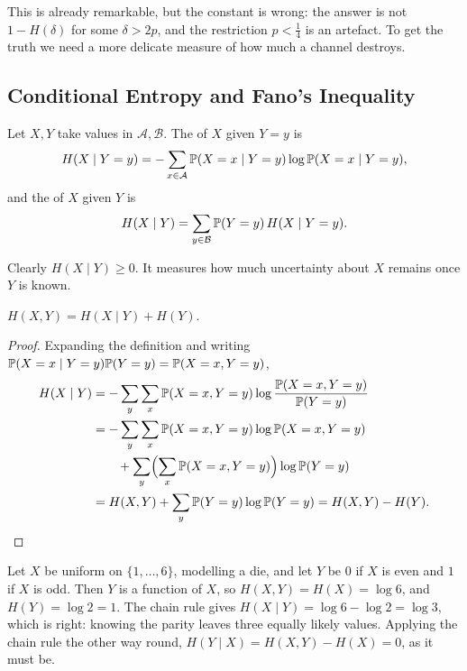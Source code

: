 \documentclass[a4paper]{scrartcl}
\newcommand{\Ac}{\mathcal{A}}
\newcommand{\Bc}{\mathcal{B}}
\begin{document}
This is already remarkable, but the constant is wrong: the answer is not $1-H(\delta)$ for some $\delta > 2p$, and the restriction $p< \tfrac14$ is an artefact. To get the truth we need a more delicate measure of how much a channel destroys.

\subsection{Conditional Entropy and Fano's Inequality}

\begin{definition}
	Let $X, Y$ take values in $\Ac, \Bc$. The  of $X$ given $Y = y$ is
	$$H(X \mid Y=y) = -\sum_{x \in \Ac}\PP(X = x\mid Y=y)\log\PP(X=x\mid Y=y),$$
	and the  of $X$ given $Y$ is
	$$H(X\mid Y) = \sum_{y\in\Bc}\PP(Y=y)\,H(X\mid Y=y).$$
\end{definition}

Clearly $H(X\mid Y)\ge0$. It measures how much uncertainty about $X$ remains once $Y$ is known.

\begin{lemma}\label{lem:chain}
	$H(X,Y) = H(X\mid Y) + H(Y)$.
\end{lemma}

\begin{proof}
	Expanding the definition and writing $\mathbb{P}(X = x \mid Y = y)\mathbb{P}(Y=y) = \mathbb{P}(X=x,Y=y)$,
	\begin{align*}
		H(X\mid Y) &= -\sum_{y}\sum_x \mathbb{P}(X=x,Y=y)\log\frac{\mathbb{P}(X=x,Y=y)}{\mathbb{P}(Y=y)}\\
		&= -\sum_{y}\sum_x \mathbb{P}(X=x,Y=y)\log\mathbb{P}(X=x,Y=y)\\
		&\qquad + \sum_y \Bigl(\sum_x\mathbb{P}(X=x,Y=y)\Bigr)\log\mathbb{P}(Y=y)\\
		&= H(X,Y) + \sum_y \mathbb{P}(Y=y)\log\mathbb{P}(Y=y) = H(X,Y)-H(Y). \qedhere
	\end{align*}
\end{proof}

\begin{example}
	Let $X$ be uniform on $\{1,\dots,6\}$, modelling a die, and let $Y$ be $0$ if $X$ is even and $1$ if $X$ is odd. Then $Y$ is a function of $X$, so $H(X,Y)=H(X)=\log 6$, and $H(Y)=\log2 = 1$. The chain rule gives $H(X\mid Y) = \log 6 - \log 2 = \log 3$, which is right: knowing the parity leaves three equally likely values. Applying the chain rule the other way round, $H(Y\mid X) = H(X,Y)-H(X) = 0$, as it must be.
\end{example}
\end{document}
